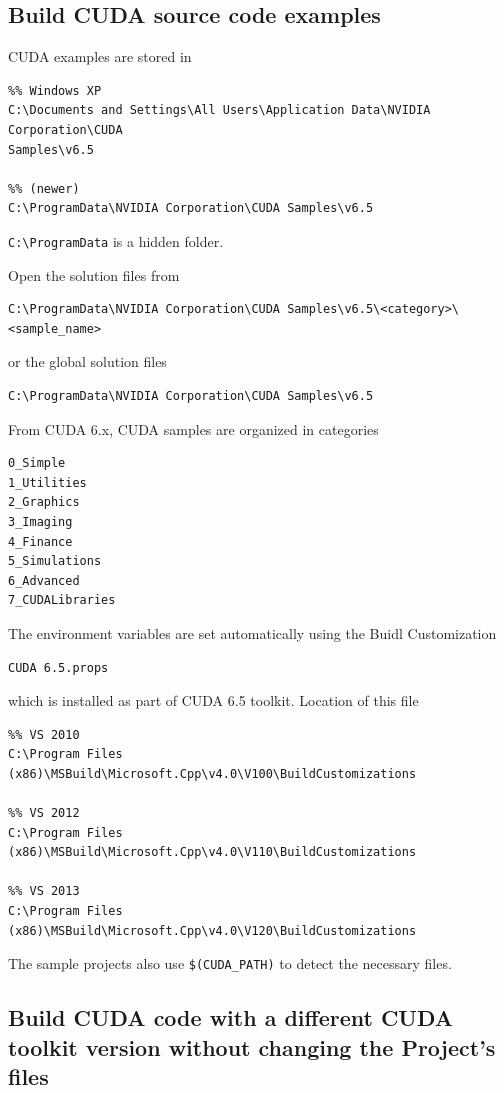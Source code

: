 \subsection{Build CUDA source code examples}

CUDA examples are stored in
\begin{verbatim}
%% Windows XP
C:\Documents and Settings\All Users\Application Data\NVIDIA Corporation\CUDA
Samples\v6.5

%% (newer)
C:\ProgramData\NVIDIA Corporation\CUDA Samples\v6.5
\end{verbatim}
\verb!C:\ProgramData! is a hidden folder.

Open the solution files from
\begin{verbatim}
C:\ProgramData\NVIDIA Corporation\CUDA Samples\v6.5\<category>\<sample_name>
\end{verbatim}
or the global solution files
\begin{verbatim}
C:\ProgramData\NVIDIA Corporation\CUDA Samples\v6.5
\end{verbatim}

From CUDA 6.x, CUDA samples are organized in categories
\begin{verbatim}
0_Simple
1_Utilities
2_Graphics
3_Imaging
4_Finance
5_Simulations
6_Advanced
7_CUDALibraries
\end{verbatim}

The environment variables are set automatically using the Buidl Customization 
\begin{verbatim}
CUDA 6.5.props
\end{verbatim}
which is installed as part of CUDA 6.5 toolkit. Location of this file

\begin{verbatim}
%% VS 2010
C:\Program Files (x86)\MSBuild\Microsoft.Cpp\v4.0\V100\BuildCustomizations

%% VS 2012
C:\Program Files (x86)\MSBuild\Microsoft.Cpp\v4.0\V110\BuildCustomizations

%% VS 2013
C:\Program Files (x86)\MSBuild\Microsoft.Cpp\v4.0\V120\BuildCustomizations
\end{verbatim}

The sample projects also use \verb!$(CUDA_PATH)! to detect the necessary files.

\subsection{Build CUDA code with a different CUDA toolkit version without
changing the Project's files}

